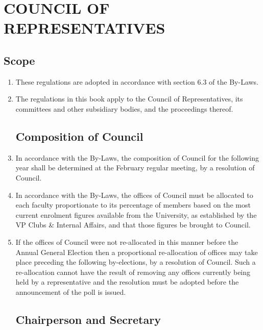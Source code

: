 \documentclass[oneside]{book}
\begin{document}
\part{\label{COUNCIL_OF_REPRESENTATIVES}COUNCIL OF REPRESENTATIVES}


\chapter{\label{Council_Scope}Scope }

\begin{enumerate}

\item These regulations are adopted in accordance with section 6.3 of the
By-Laws. 
\item The regulations in this book apply to the Council of Representatives,
its committees and other subsidiary bodies, and the proceedings thereof. 

\chapter{\label{Composition_of_Council}Composition of Council }
\item In accordance with the By-Laws, the composition of Council for the
following year shall be determined at the February regular meeting, by a resolution of Council. 
\item In accordance with the By-Laws, the offices of Council must be allocated
to each faculty proportionate to its percentage of members based on
the most current enrolment figures available from the University, as established by the VP Clubs 
& Internal Affairs, and that those figures be brought to Council.
\item If the offices of Council were not re-allocated in this manner before the Annual General Election 
then a proportional re-allocation of offices may take place preceding the following by-elections, 
by a resolution of Council. Such a re-allocation cannot have the result of removing any offices 
currently being held by a representative and the resolution must be adopted before the announcement 
of the poll is issued.

\chapter{\label{Chairperson_and_Secretary}Chairperson and Secretary }



\end{enumerate}
\end{document}
